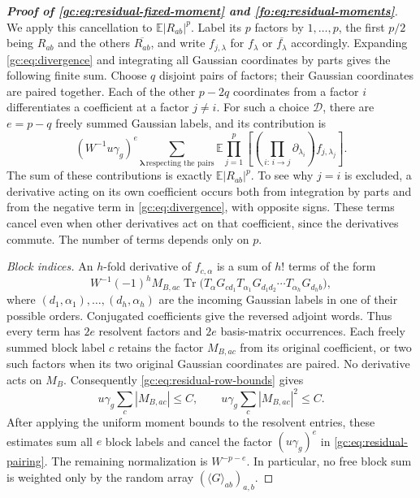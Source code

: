 \documentclass[11pt]{article}
\numberwithin{equation}{section}
\theoremstyle{remark}
\newcommand{\E}{\mathbb E}
\newcommand{\Tr}{\operatorname{Tr}}
\begin{document}
\begin{proof}[\textbf{Proof of \eqref{gc:eq:residual-fixed-moment} and \eqref{fo:eq:residual-moments}}]
We apply this cancellation to $\E|R_{ab}|^p$.
Label its $p$ factors by $1,\ldots,p$, the first $p/2$ being $R_{ab}$
and the others $\overline{R_{ab}}$, and write $f_{j,\lambda}$ for
$f_\lambda$ or $\overline{f_\lambda}$ accordingly.
Expanding \eqref{gc:eq:divergence} and integrating all Gaussian
coordinates by parts gives the following finite sum.
Choose $q$ disjoint pairs of factors; their Gaussian coordinates
are paired together. Each of the other $p-2q$ coordinates from a
factor $i$ differentiates a coefficient at a factor $j\ne i$.
For such a choice $\mathcal D$, there are $e=p-q$ freely summed
Gaussian labels, and its contribution is
\begin{equation}\label{gc:eq:residual-pairing}
 \left(W^{-1} u\gamma_g\right)^e
 \sum_{\boldsymbol\lambda\,\text{respecting the pairs}}
 \E\prod_{j=1}^p
     \left[\left(\prod_{i:\,i\to j}\partial_{\lambda_i}\right)
                    f_{j,\lambda_j}\right].
\end{equation}
The sum of these contributions is exactly $\E|R_{ab}|^p$.
To see why $j=i$ is excluded, a derivative acting on its own
coefficient occurs both from integration by parts and from the
negative term in \eqref{gc:eq:divergence}, with opposite signs.
These terms cancel even when other derivatives act on that coefficient,
since the derivatives commute. The number of terms depends only on $p$.

\emph{Block indices.}
An $h$-fold derivative of $f_{c,\alpha}$ is a sum of $h!$ terms
of the form
\[
 W^{-1} (-1)^hM_{B,ac}
 \Tr\bigl(T_\alpha G_{cd_1}T_{\alpha_1}
          G_{d_1d_2}\cdots T_{\alpha_h}G_{d_hb}\bigr),
\]
where $(d_1,\alpha_1),\ldots,(d_h,\alpha_h)$ are the incoming
Gaussian labels in one of their possible orders. Conjugated
coefficients give the reversed adjoint words. Thus every term has
$2e$ resolvent factors and $2e$ basis-matrix occurrences.
Each freely summed block label $c$ retains the factor $M_{B,ac}$
from its original coefficient, or two such factors when its two
original Gaussian coordinates are paired. No derivative acts on $M_B$.
Consequently \eqref{gc:eq:residual-row-bounds} gives
\[
 u\gamma_g\sum_c|M_{B,ac}|\le C,\qquad
 u\gamma_g\sum_c|M_{B,ac}|^2\le C.
\]
After applying the uniform moment bounds to the resolvent entries,
these estimates sum all $e$ block labels and cancel the factor
$(u\gamma_g)^e$ in \eqref{gc:eq:residual-pairing}.
The remaining normalization is $W^{-p-e}$.
In particular, no free block sum is weighted only by the random
array $(\langle G\rangle_{ab})_{a,b}$.


\end{proof}
\end{document}
